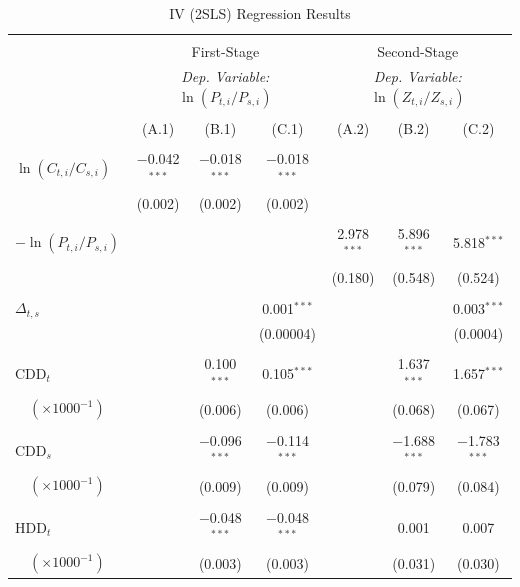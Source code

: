 \documentclass[11pt,a4paper]{extarticle}
\begin{document}
\begin{table}[h] \centering 
	\vspace{-2em}
	\caption{IV (2SLS) Regression Results}
	\label{table:2} 
	\small
	\begin{tabular}{@{\extracolsep{4pt}}lcccccc} 
		\\[-4ex]\hline  
		\hline \\[-1.6ex] 
		& \multicolumn{3}{c}{First-Stage} & \multicolumn{3}{c}{Second-Stage} \\ [0.5ex]
		& \multicolumn{3}{c}{\textit{Dep. Variable:} $\ln (P_{t,i} / P_{s,i})$ } & \multicolumn{3}{c}{\textit{Dep. Variable:}  $\ln (Z_{ t, i} / Z_{ s, i})$}\\ [0.5ex]
		\cmidrule(lr){2-4} \cmidrule(lr){5-7}\\[-2.2ex] 
		& (A.1) & (B.1) & (C.1) & (A.2) & (B.2) & (C.2)\\ [0.5ex]
		\hline \\[-1.8ex] 
		$ \ln (C_{t,i} / C_{s,i})$ & $-$0.042$^{***}$ & $-$0.018$^{***}$ & $-$0.018$^{***}$ &  &  &  \\ 
		& (0.002) & (0.002) & (0.002) &  &  &  \\ 
		& & & & & & \\ 
		$-\ln (P_{t,i} / P_{s,i})$ &  &  &  & 2.978$^{***}$ & 5.896$^{***}$ & 5.818$^{***}$ \\ 
		&  &  &  & (0.180) & (0.548) & (0.524) \\ 
		& & & & & & \\ 
		$\Delta_{t,s}$  &  &  & 0.001$^{***}$ &  &  & 0.003$^{***}$ \\ 
		&  &  & (0.00004) &  &  & (0.0004) \\ 
		& & & & & & \\ 
		CDD$_t$  &  & 0.100$^{***}$ & 0.105$^{***}$ &  & 1.637$^{***}$ & 1.657$^{***}$ \\ 
		$\quad(\times 1000^{-1})$ &  & (0.006) & (0.006) &  & (0.068) & (0.067) \\ 
		& & & & & & \\ 
		CDD$_s$ &  & $-$0.096$^{***}$ & $-$0.114$^{***}$ &  & $-$1.688$^{***}$ & $-$1.783$^{***}$ \\ 
		$\quad(\times 1000^{-1})$  &  & (0.009) & (0.009) &  & (0.079) & (0.084) \\ 
		& & & & & & \\ 
		HDD$_t$  &  & $-$0.048$^{***}$ & $-$0.048$^{***}$ &  & 0.001 & 0.007 \\ 
		$\quad(\times 1000^{-1})$ &  & (0.003) & (0.003) &  & (0.031) & (0.030) \\ 

\end{tabular}
\end{table}
\end{document}
